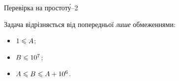\begin{problemAllDefault}{Перевірка на простот\'{у}--2}\label{task:check-prime-2}

Задача відрізняється від попередньої \emph{лише} обмеженнями:

\vspace{-0.5\baselineskip}

\begin{multicols}{3}
\begin{itemize}
\item
$1\leqslant A$;
\item
$B\leqslant10^7$;
\item
$A\leqslant B\leqslant A+10^6$.
\end{itemize}
\end{multicols}

\vspace{-0.5\baselineskip}

\end{problemAllDefault}